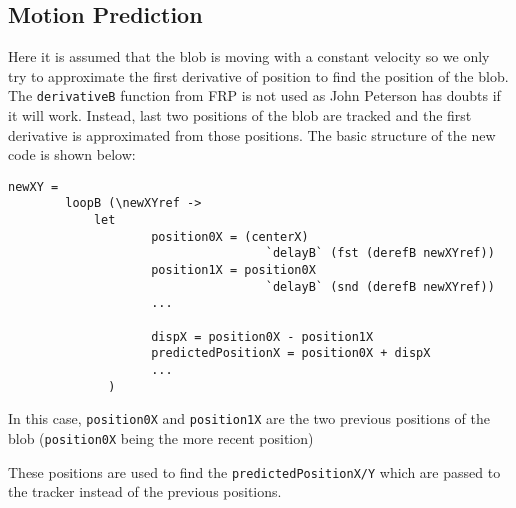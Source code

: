 \documentclass[12pt]{article}
\begin{document}
\subsection{Motion Prediction}
\par Here it is assumed that the blob is moving with a constant velocity so we only try to approximate the first derivative of position to find the position of the blob. The {\tt derivativeB} function from FRP is not used as John Peterson has doubts if it will work. Instead, last two positions of the blob are tracked and the first derivative is approximated from those positions. The basic structure of the new code is shown below:
\begin{verbatim}
newXY = 
        loopB (\newXYref ->
            let
                    position0X = (centerX) 
                                    `delayB` (fst (derefB newXYref))
                    position1X = position0X
                                    `delayB` (snd (derefB newXYref))
                    ...

                    dispX = position0X - position1X
                    predictedPositionX = position0X + dispX
                    ...
              )
\end{verbatim}
\par In this case, {\tt position0X} and {\tt position1X} are the two previous positions of the blob ({\tt position0X} being the more recent position)
\par These positions are used to find the {\tt predictedPositionX/Y} which are passed to the tracker instead of the previous positions.
\end{document}
